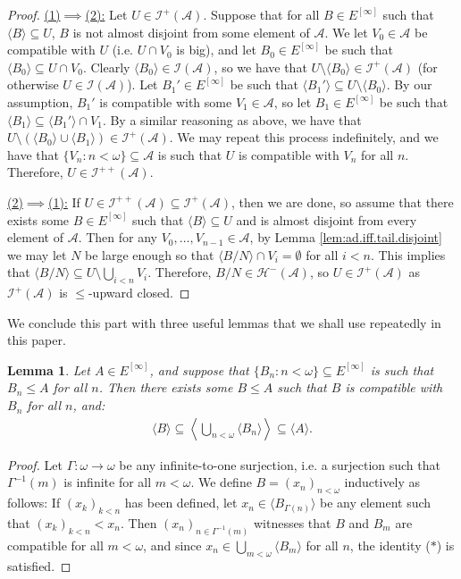 \documentclass[10pt,a4paper]{amsart}
\theoremstyle{plain}
\numberwithin{equation}{section}
\newtheorem{lemma}[theorem]{Lemma}
\theoremstyle{definition}
\renewcommand{\c}[1]{\langle #1 \rangle}
\newcommand{\bigc}[1]{\left\langle #1 \right\rangle}
\newcommand{\cal}{\mathcal}
\newcommand{\A}{\cal{A}}
\renewcommand{\H}{\cal{H}}
\newcommand{\I}{\cal{I}}
\begin{document}
\begin{proof}    
    \underline{(1)$\implies$(2):} Let $U \in \I^+(\A)$. Suppose that for all $B \in E^{[\infty]}$ such that $\c{B} \subseteq U$, $B$ is not almost disjoint from some element of $\A$. We let $V_0 \in \A$ be compatible with $U$ (i.e. $U \cap V_0$ is big), and let $B_0 \in E^{[\infty]}$ be such that $\c{B_0} \subseteq U \cap V_0$. Clearly $\c{B_0} \in \I(\A)$, so we have that $U \setminus \c{B_0} \in \I^+(\A)$ (for otherwise $U \in \I(\A)$). Let $B_1' \in E^{[\infty]}$ be such that $\c{B_1'} \subseteq U \setminus \c{B_0}$. By our assumption, $B_1'$ is compatible with some $V_1 \in \A$, so let $B_1 \in E^{[\infty]}$ be such that $\c{B_1} \subseteq \c{B_1'} \cap V_1$. By a similar reasoning as above, we have that $U \setminus (\c{B_0} \cup \c{B_1}) \in \I^+(\A)$. We may repeat this process indefinitely, and we have that $\{V_n : n < \omega\} \subseteq \A$ is such that $U$ is compatible with $V_n$ for all $n$. Therefore, $U \in \I^{++}(\A)$.

    \underline{(2)$\implies$(1):} If $U \in \I^{++}(\A) \subseteq \I^+(\A)$, then we are done, so assume that there exists some $B \in E^{[\infty]}$ such that $\c{B} \subseteq U$ and is almost disjoint from every element of $\A$. Then for any $V_0,\dots,V_{n-1} \in \A$, by Lemma \ref{lem:ad.iff.tail.disjoint} we may let $N$ be large enough so that $\c{B/N} \cap V_i = \emptyset$ for all $i < n$. This implies that $\c{B/N} \subseteq U \setminus \bigcup_{i<n} V_i$. Therefore, $B/N \in \H^-(\A)$, so $U \in \I^+(\A)$ as $\I^+(\A)$ is $\leq$-upward closed.
\end{proof}

We conclude this part with three useful lemmas that we shall use repeatedly in this paper.

\begin{lemma}
\label{lem:infinite.compatibility.lemma.1}
    Let $A \in E^{[\infty]}$, and suppose that $\{B_n : n < \omega\} \subseteq E^{[\infty]}$ is such that $B_n \leq A$ for all $n$. Then there exists some $B \leq A$ such that $B$ is compatible with $B_n$ for all $n$, and:
    \begin{align*}
        \c{B} \subseteq \bigc{\bigcup_{n<\omega} \c{B_n}} \subseteq \c{A}. \tag{$*$}
    \end{align*}
\end{lemma}

\begin{proof}
    Let $\Gamma : \omega \to \omega$ be any infinite-to-one surjection, i.e. a surjection such that $\Gamma^{-1}(m)$ is infinite for all $m < \omega$. We define $B = (x_n)_{n<\omega}$ inductively as follows: If $(x_k)_{k<n}$ has been defined, let $x_n \in \c{B_{\Gamma(n)}}$ be any element such that $(x_k)_{k<n} < x_n$. Then $(x_n)_{n\in\Gamma^{-1}(m)}$ witnesses that $B$ and $B_m$ are compatible for all $m < \omega$, and since $x_n \in \bigcup_{m<\omega} \c{B_m}$ for all $n$, the identity ($*$) is satisfied. 
\end{proof}
\end{document}
